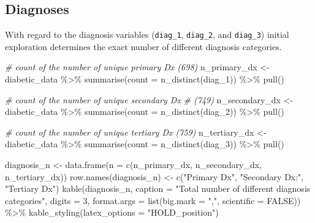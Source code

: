 \documentclass[
]{article}
\newenvironment{Shaded}{\begin{snugshade}}{\end{snugshade}}
\newcommand{\AttributeTok}[1]{\textcolor[rgb]{0.77,0.63,0.00}{#1}}
\newcommand{\CommentTok}[1]{\textcolor[rgb]{0.56,0.35,0.01}{\textit{#1}}}
\newcommand{\ConstantTok}[1]{\textcolor[rgb]{0.00,0.00,0.00}{#1}}
\newcommand{\DecValTok}[1]{\textcolor[rgb]{0.00,0.00,0.81}{#1}}
\newcommand{\FunctionTok}[1]{\textcolor[rgb]{0.00,0.00,0.00}{#1}}
\newcommand{\NormalTok}[1]{#1}
\newcommand{\OtherTok}[1]{\textcolor[rgb]{0.56,0.35,0.01}{#1}}
\newcommand{\SpecialCharTok}[1]{\textcolor[rgb]{0.00,0.00,0.00}{#1}}
\newcommand{\StringTok}[1]{\textcolor[rgb]{0.31,0.60,0.02}{#1}}
\begin{document}
\hypertarget{diagnoses}{%
\subsection{Diagnoses}\label{diagnoses}}

With regard to the diagnosis variables (\texttt{diag\_1},
\texttt{diag\_2}, and \texttt{diag\_3}) initial exploration determines
the exact number of different diagnosis categories.

\begin{Shaded}
\begin{Highlighting}[]
\CommentTok{\# count of the number of unique primary Dx (698)}
\NormalTok{n\_primary\_dx }\OtherTok{\textless{}{-}}\NormalTok{ diabetic\_data }\SpecialCharTok{\%\textgreater{}\%}
    \FunctionTok{summarise}\NormalTok{(}\AttributeTok{count =} \FunctionTok{n\_distinct}\NormalTok{(diag\_1)) }\SpecialCharTok{\%\textgreater{}\%}
    \FunctionTok{pull}\NormalTok{()}

\CommentTok{\# count of the number of unique secondary Dx}
\CommentTok{\# (749)}
\NormalTok{n\_secondary\_dx }\OtherTok{\textless{}{-}}\NormalTok{ diabetic\_data }\SpecialCharTok{\%\textgreater{}\%}
    \FunctionTok{summarise}\NormalTok{(}\AttributeTok{count =} \FunctionTok{n\_distinct}\NormalTok{(diag\_2)) }\SpecialCharTok{\%\textgreater{}\%}
    \FunctionTok{pull}\NormalTok{()}

\CommentTok{\# count of the number of unique tertiary Dx (759)}
\NormalTok{n\_tertiary\_dx }\OtherTok{\textless{}{-}}\NormalTok{ diabetic\_data }\SpecialCharTok{\%\textgreater{}\%}
    \FunctionTok{summarise}\NormalTok{(}\AttributeTok{count =} \FunctionTok{n\_distinct}\NormalTok{(diag\_3)) }\SpecialCharTok{\%\textgreater{}\%}
    \FunctionTok{pull}\NormalTok{()}

\NormalTok{diagnosis\_n }\OtherTok{\textless{}{-}} \FunctionTok{data.frame}\NormalTok{(}\AttributeTok{n =} \FunctionTok{c}\NormalTok{(n\_primary\_dx, n\_secondary\_dx,}
\NormalTok{    n\_tertiary\_dx))}
\FunctionTok{row.names}\NormalTok{(diagnosis\_n) }\OtherTok{\textless{}{-}} \FunctionTok{c}\NormalTok{(}\StringTok{"Primary Dx"}\NormalTok{, }\StringTok{"Secondary Dx:"}\NormalTok{,}
    \StringTok{"Tertiary Dx"}\NormalTok{)}
\FunctionTok{kable}\NormalTok{(diagnosis\_n, }\AttributeTok{caption =} \StringTok{"Total number of different diagnosis categories"}\NormalTok{,}
    \AttributeTok{digits =} \DecValTok{3}\NormalTok{, }\AttributeTok{format.args =} \FunctionTok{list}\NormalTok{(}\AttributeTok{big.mark =} \StringTok{","}\NormalTok{,}
        \AttributeTok{scientific =} \ConstantTok{FALSE}\NormalTok{)) }\SpecialCharTok{\%\textgreater{}\%}
    \FunctionTok{kable\_styling}\NormalTok{(}\AttributeTok{latex\_options =} \StringTok{"HOLD\_position"}\NormalTok{)}
\end{Highlighting}
\end{Shaded}
\end{document}
